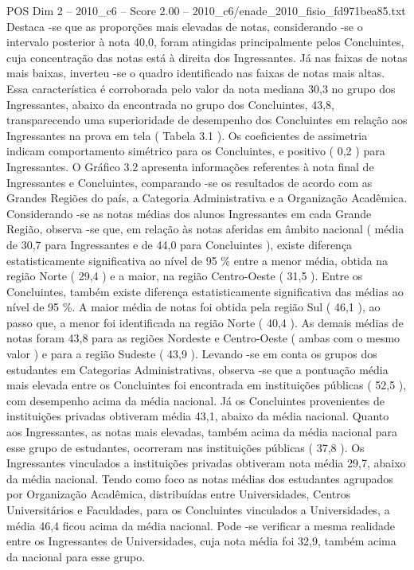 \begin{textsample}{POS Dim 2 – 2010\_c6 – Score 2.00 – 2010\_c6/enade\_2010\_fisio\_fd971bea85.txt}
Destaca -se que as proporções mais elevadas de notas, considerando -se o intervalo posterior à nota 40,0, foram atingidas principalmente pelos Concluintes, cuja concentração das notas está à direita dos Ingressantes.
Já nas faixas de notas mais baixas, inverteu -se o quadro identificado nas faixas de notas mais altas.
Essa característica é corroborada pelo valor da nota mediana 30,3 no grupo dos Ingressantes, abaixo da encontrada no grupo dos Concluintes, 43,8, transparecendo uma superioridade de desempenho dos Concluintes em relação aos Ingressantes na prova em tela ( Tabela 3.1 ).
Os coeficientes de assimetria indicam comportamento simétrico para os Concluintes, e positivo ( 0,2 ) para Ingressantes.
O Gráfico 3.2 apresenta informações referentes à nota final de Ingressantes e Concluintes, comparando -se os resultados de acordo com as Grandes Regiões do país, a Categoria Administrativa e a Organização Acadêmica.
Considerando -se as notas médias dos alunos Ingressantes em cada Grande Região, observa -se que, em relação às notas aferidas em âmbito nacional ( média de 30,7 para Ingressantes e de 44,0 para Concluintes ), existe diferença estatisticamente significativa ao nível de 95 \% entre a menor média, obtida na região Norte ( 29,4 ) e a maior, na região Centro-Oeste ( 31,5 ).
Entre os Concluintes, também existe diferença estatisticamente significativa das médias ao nível de 95 \%.
A maior média de notas foi obtida pela região Sul ( 46,1 ), ao passo que, a menor foi identificada na região Norte ( 40,4 ).
As demais médias de notas foram 43,8 para as regiões Nordeste e Centro-Oeste ( ambas com o mesmo valor ) e para a região Sudeste ( 43,9 ).
Levando -se em conta os grupos dos estudantes em Categorias Administrativas, observa -se que a pontuação média mais elevada entre os Concluintes foi encontrada em instituições públicas ( 52,5 ), com desempenho acima da média nacional.
Já os Concluintes provenientes de instituições privadas obtiveram média 43,1, abaixo da média nacional.
Quanto aos Ingressantes, as notas mais elevadas, também acima da média nacional para esse grupo de estudantes, ocorreram nas instituições públicas ( 37,8 ).
Os Ingressantes vinculados a instituições privadas obtiveram nota média 29,7, abaixo da média nacional.
Tendo como foco as notas médias dos estudantes agrupados por Organização Acadêmica, distribuídas entre Universidades, Centros Universitários e Faculdades, para os Concluintes vinculados a Universidades, a média 46,4 ficou acima da média nacional.
Pode -se verificar a mesma realidade entre os Ingressantes de Universidades, cuja nota média foi 32,9, também acima da nacional para esse grupo.

\end{textsample}
